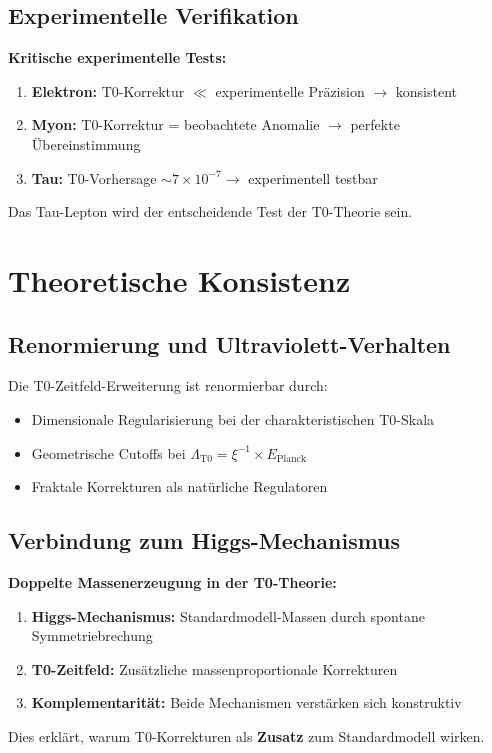 \documentclass[12pt,a4paper]{article}
\newcommand{\xipar}{\xi}
\begin{document}
	\subsection{Experimentelle Verifikation}
	
	\begin{warning}
		\textbf{Kritische experimentelle Tests:}
		
		\begin{enumerate}
			\item \textbf{Elektron:} T0-Korrektur $\ll$ experimentelle Präzision $\rightarrow$ konsistent
			\item \textbf{Myon:} T0-Korrektur = beobachtete Anomalie $\rightarrow$ perfekte Übereinstimmung
			\item \textbf{Tau:} T0-Vorhersage $\sim 7 \times 10^{-7} \rightarrow$ experimentell testbar
		\end{enumerate}
		
		Das Tau-Lepton wird der entscheidende Test der T0-Theorie sein.
	\end{warning}
	
	\section{Theoretische Konsistenz}
	
	\subsection{Renormierung und Ultraviolett-Verhalten}
	
	Die T0-Zeitfeld-Erweiterung ist renormierbar durch:
	
	\begin{itemize}
		\item Dimensionale Regularisierung bei der charakteristischen T0-Skala
		\item Geometrische Cutoffs bei $\Lambda_{\text{T0}} = \xipar^{-1} \times E_{\text{Planck}}$
		\item Fraktale Korrekturen als natürliche Regulatoren
	\end{itemize}
	
	\subsection{Verbindung zum Higgs-Mechanismus}
	
	\begin{breakthrough}
		\textbf{Doppelte Massenerzeugung in der T0-Theorie:}
		
		\begin{enumerate}
			\item \textbf{Higgs-Mechanismus:} Standardmodell-Massen durch spontane Symmetriebrechung
			\item \textbf{T0-Zeitfeld:} Zusätzliche massenproportionale Korrekturen
			\item \textbf{Komplementarität:} Beide Mechanismen verstärken sich konstruktiv
		\end{enumerate}
		
		Dies erklärt, warum T0-Korrekturen als \textbf{Zusatz} zum Standardmodell wirken.
	\end{breakthrough}
	
\end{document}
